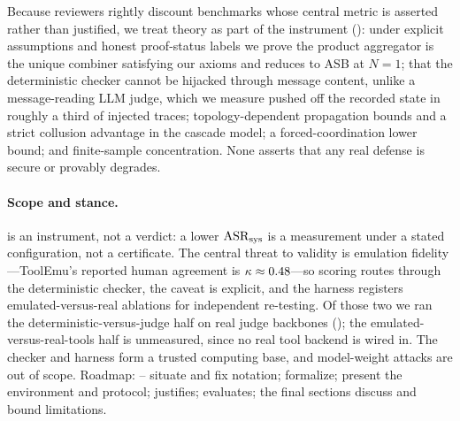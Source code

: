 Because reviewers rightly discount benchmarks whose central metric is asserted rather than
justified, we treat theory as part of the instrument (): under explicit
assumptions and honest proof-status labels we prove the product aggregator is the unique
combiner satisfying our axioms and reduces to ASB at $N{=}1$; that the deterministic
checker cannot be hijacked through message content, unlike a message-reading LLM judge,
which we measure pushed off the recorded state in roughly a third of injected traces;
topology-dependent propagation bounds and a strict collusion advantage in the cascade
model; a forced-coordination lower bound; and finite-sample concentration. None
asserts that any real defense is secure or provably degrades.

\paragraph{Scope and stance.}
 is an instrument, not a verdict: a lower $\mathrm{ASR}_{\mathrm{sys}}$ is a measurement under a stated
configuration, not a certificate. The central threat to validity is emulation
fidelity---ToolEmu's reported human agreement is $\kappa\approx0.48$---so scoring routes
through the deterministic checker, the caveat is explicit, and the harness registers
emulated-versus-real ablations for independent re-testing. Of those two we ran the
deterministic-versus-judge half on real judge backbones (); the
emulated-versus-real-tools half is unmeasured, since no real tool backend is wired in.
The checker and harness form a trusted computing base, and model-weight attacks are out
of scope. Roadmap:
-- situate and fix notation; 
formalize;  present the environment and protocol;
 justifies;  evaluates; the final sections discuss and
bound limitations.